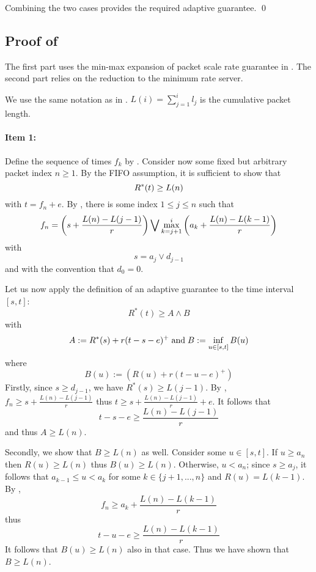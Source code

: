  Combining the two cases provides the required adaptive
guarantee.
 \qed


\subsection{Proof of } The first part uses
the min-max expansion of packet scale rate guarantee in
. The second part relies on the
reduction to the minimum rate server.

We use the same notation as in .
 $L(i)=\sum_{j=1}^i l_j$ is the cumulative packet length.

 \paragraph{Item 1: } Define the sequence of times $f_k$ by
 . Consider now some fixed but arbitrary packet index $n\geq
 1$.
 By the FIFO assumption, it is sufficient to show that
\begin{equation}\mylabel{eq-ascpr9832}
  R^*(t) \geq L(n)
\end{equation}
 with $t=f_n+e$. By , there is some
 index $1 \leq j \leq n$ such that
\begin{equation}\mylabel{eq-maxplusasc1}
 f_n=
 \left( s +\frac{ L(n) -L(j-1)}{r} \right)
  \bigvee
      \max_{k=j+1}^i \left(a_k + \frac{L(n)-L(k-1)}{r}
       \right)
\end{equation}
with $$s=a_j \vee d_{j-1}$$ and with the convention that
$d_0=0$.

Let us now apply the definition of an adaptive guarantee to
the time interval $[s,t]$:
$$
R^*(t) \geq A \wedge B
$$
with
 $$
 A:=R^*(s) + r(t-s-e)^+ \mathrm{\; and \; }
B:=\inf_{u \in [s,t]} B(u)
 $$
 where
 $$B(u):=\left(
 R(u) + r(t-u-e)^+
 \right)
 $$
 Firstly, since $s \geq d_{j-1}$, we have $R^*(s) \geq L(j-1)$. By
 , $f_n \geq s +\frac{ L(n) -L(j-1)}{r}$
 thus $t \geq s +\frac{ L(n) -L(j-1)}{r} + e$. It follows that
 $$
 t-s-e \geq \frac{ L(n) -L(j-1)}{r}
 $$
 and thus $A\geq L(n)$.

 Secondly, we show that $B\geq L(n)$ as well. Consider some $u \in
 [s,t]$. If $u\geq a_n$ then $R(u) \geq L(n)$ thus $B(u) \geq
 L(n)$. Otherwise, $u<a_n$; since $s\geq a_{j}$, it follows that
 $a_{k-1} \leq u <a_{k}$ for some $k \in\{j+1, ..., n\}$ and
 $R(u) = L(k-1)$. By ,
 $$
 f_n \geq a_k + \frac{L(n)-L(k-1)}{r}
 $$
 thus
 $$
 t-u-e \geq \frac{L(n)-L(k-1)}{r}
 $$
 It follows that $B(u) \geq L(n)$ also in that case. Thus we have
 shown that $B\geq L(n)$.

